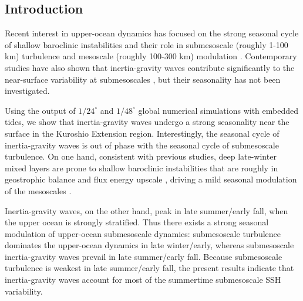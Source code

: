 \documentclass[grl]{agutex2015}
\begin{document}
\begin{article}

%
%

\section{Introduction}

Recent interest in upper-ocean dynamics has focused on the strong seasonal
cycle of shallow baroclinic instabilities and their role in submesoscale (roughly 1-100 km)
turbulence and mesoscale (roughly 100-300 km) modulation \citep{sasaki_etal2014,qiu_etal2014,
callies_etal2015, thompson_etal2016,buckingham_etal2016}. Contemporary studies
have also shown that inertia-gravity waves contribute significantly
to the near-surface variability at submesoscales \citep{richman_etal2012,
buhler_etal2014,rocha_etal2016}, but their seasonality has not been investigated.

Using the output of $1/24^\circ$ and $1/48^\circ$ global
numerical simulations with embedded tides, we show that inertia-gravity waves undergo
a strong seasonality near the surface in the Kuroshio Extension region.
Interestingly, the seasonal cycle of inertia-gravity waves is out of phase
with the seasonal cycle of submesoscale turbulence. On one hand, consistent with previous studies,
deep late-winter mixed layers are prone to
shallow baroclinic instabilities that are roughly in geostrophic balance
and flux energy upscale \citep{sasaki_etal2014,callies_etal2016},
driving a mild seasonal modulation of the mesoscales \citep{sasaki_etal2014,qiu_etal2014}.

Inertia-gravity waves, on the other hand, peak in late summer/early fall,
when the upper ocean is strongly stratified. Thus there exists a
strong seasonal modulation of upper-ocean submesoscale dynamics:
submesoscale turbulence dominates the upper-ocean dynamics in late winter/early,
whereas submesoscale inertia-gravity waves prevail in late summer/early fall.
Because submesoscale turbulence is weakest in late summer/early fall,
the present results indicate that inertia-gravity waves account for most of the
summertime submesoscale SSH variability.


\end{article}
\end{document}
